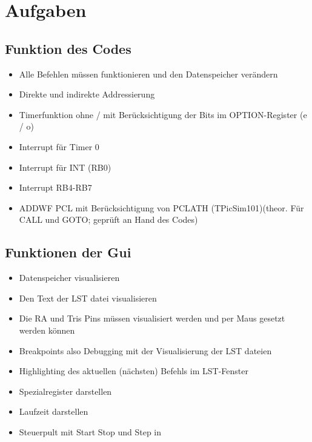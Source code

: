 
\section{Aufgaben}

\subsection{Funktion des Codes}

\begin{itemize}
    \item Alle Befehlen müssen funktionieren und den Datenspeicher verändern
    \item Direkte und indirekte Addressierung
    \item Timerfunktion ohne / mit Berücksichtigung der Bits im OPTION-Register (e / o)
    \item Interrupt für Timer 0
    \item Interrupt für INT (RB0)
    \item Interrupt RB4-RB7
    \item ADDWF PCL mit Berücksichtigung von PCLATH (TPicSim101)(theor. Für CALL und GOTO; geprüft an Hand des Codes)
\end{itemize}

\subsection{Funktionen der Gui}
\begin{itemize}
    \item Datenspeicher visualisieren
    \item Den Text der LST datei visualisieren
    \item Die RA und Tris Pins müssen visualisiert werden und per Maus gesetzt werden können
    \item Breakpoints also Debugging mit der Visualisierung der LST dateien
    \item Highlighting des aktuellen (nächsten) Befehls im LST-Fenster 
    \item Spezialregister darstellen
    \item Laufzeit darstellen
    \item Steuerpult mit Start Stop und Step in
\end{itemize}

